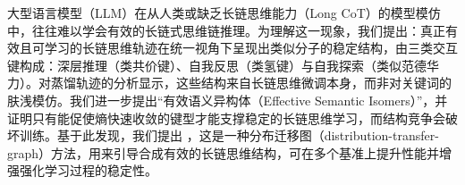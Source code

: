 大型语言模型（LLM）在从人类或缺乏长链思维能力（Long CoT）的模型模仿中，往往难以学会有效的长链式思维链推理。为理解这一现象，我们提出：真正有效且可学习的长链思维轨迹在统一视角下呈现出类似分子的稳定结构，由三类交互键构成：深层推理（类共价键）、自我反思（类氢键）与自我探索（类似范德华力）。对蒸馏轨迹的分析显示，这些结构来自长链思维微调本身，而非对关键词的肤浅模仿。我们进一步提出“有效语义异构体（Effective Semantic Isomers）”，并证明只有能促使熵快速收敛的键型才能支撑稳定的长链思维学习，而结构竞争会破坏训练。基于此发现，我们提出 \method，这是一种分布迁移图（distribution-transfer-graph）方法，用来引导合成有效的长链思维结构，可在多个基准上提升性能并增强强化学习过程的稳定性。